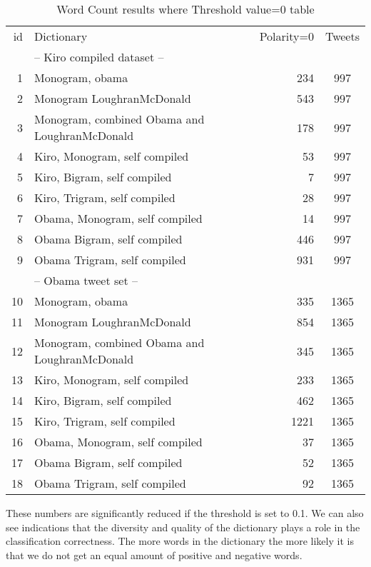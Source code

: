\begin{table}
\centering
\label{tbl:word_counting_polarity_null}
\caption{Word Count results where Threshold value=0 table}
\begin{tabular}{ r p{6cm} r c }
id & Dictionary & Polarity=0 & Tweets \\
& -- Kiro compiled dataset -- & & \\
\hline
1 & Monogram, obama & 234 & 997 \\ 
2 & Monogram LoughranMcDonald & 543 & 997 \\ 
3 & Monogram, combined Obama and LoughranMcDonald & 178 & 997 \\
4 & Kiro, Monogram, self compiled & 53 & 997 \\
5 & Kiro, Bigram, self compiled & 7 & 997 \\
6 & Kiro, Trigram, self compiled & 28 & 997 \\
7 & Obama, Monogram, self compiled & 14 & 997 \\
8 & Obama Bigram, self compiled & 446 & 997 \\
9 & Obama Trigram, self compiled & 931 & 997 \\

& -- Obama tweet set -- & & \\
\hline
10 & Monogram, obama & 335 & 1365 \\ 
11 & Monogram LoughranMcDonald & 854 & 1365 \\
12 & Monogram, combined Obama and LoughranMcDonald & 345 & 1365 \\
13 & Kiro, Monogram, self compiled & 233 & 1365 \\
14 & Kiro, Bigram, self compiled & 462 & 1365 \\
15 & Kiro, Trigram, self compiled & 1221 & 1365 \\
16 & Obama, Monogram, self compiled & 37 & 1365 \\
17 & Obama Bigram, self compiled & 52 & 1365 \\
18 & Obama Trigram, self compiled & 92 & 1365 \\
\end{tabular}
\end{table}

These numbers are significantly reduced if the threshold is set to 0.1.
We can also see indications that the diversity and quality of the dictionary
plays a role in the classification correctness. The more words in the
dictionary the more likely it is that we do not get an equal amount of positive
and negative words. 
%

